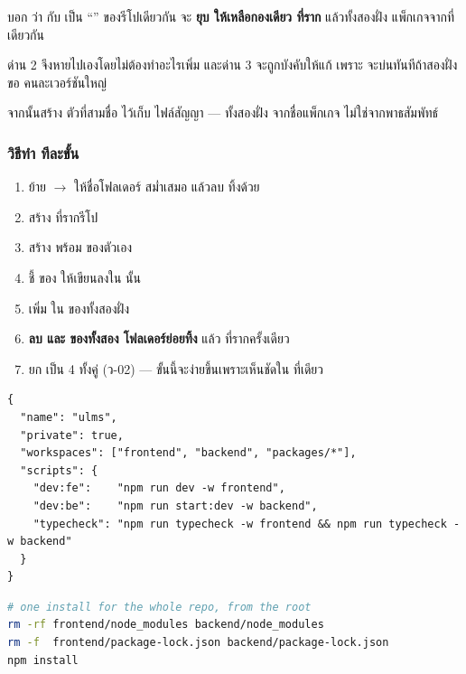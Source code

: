 บอก  ว่า  กับ  เป็น ``''
ของรีโปเดียวกัน  จะ \textbf{ยุบ  ให้เหลือกองเดียว
ที่ราก} แล้วทั้งสองฝั่ง  แพ็กเกจจากที่เดียวกัน

ด่าน 2 จึงหายไปเองโดยไม่ต้องทำอะไรเพิ่ม และด่าน 3 จะถูกบังคับให้แก้ เพราะ
 จะบ่นทันทีถ้าสองฝั่งขอ  คนละเวอร์ชันใหญ่

จากนั้นสร้าง  ตัวที่สามชื่อ  ไว้เก็บ
ไฟล์สัญญา --- ทั้งสองฝั่ง  จากชื่อแพ็กเกจ ไม่ใช่จากพาธสัมพัทธ์

\subsubsection{วิธีทำ ทีละขั้น}

\begin{enumerate}
  เข้า  (0 
      ---  เข้าไปแล้ว)
\item ย้าย  $\to$  ให้ชื่อโฟลเดอร์
      สม่ำเสมอ แล้วลบ  ทิ้งด้วย 
\item สร้าง  ที่รากรีโป
\item สร้าง  พร้อม  ของตัวเอง
\item ชี้  ของ  ให้เขียนลงใน  นั้น
\item เพิ่ม  ใน  ของทั้งสองฝั่ง
\item \textbf{ลบ  และ  ของทั้งสอง
      โฟลเดอร์ย่อยทิ้ง} แล้ว  ที่รากครั้งเดียว
\item ยก  เป็น 4 ทั้งคู่ (ว-02) --- ขั้นนี้จะง่ายขึ้นเพราะเห็นชัดใน
      ที่เดียว
\end{enumerate}

\begin{lstlisting}[language={}]
{
  "name": "ulms",
  "private": true,
  "workspaces": ["frontend", "backend", "packages/*"],
  "scripts": {
    "dev:fe":    "npm run dev -w frontend",
    "dev:be":    "npm run start:dev -w backend",
    "typecheck": "npm run typecheck -w frontend && npm run typecheck -w backend"
  }
}
\end{lstlisting}

\begin{lstlisting}[language=bash]
# one install for the whole repo, from the root
rm -rf frontend/node_modules backend/node_modules
rm -f  frontend/package-lock.json backend/package-lock.json
npm install
\end{lstlisting}

